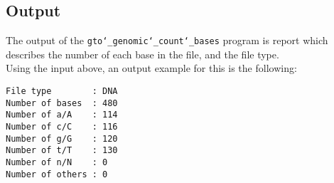 \subsection*{Output}
The output of the \texttt{gto\char`_genomic\char`_count\char`_bases} program is report which describes the number of each base in the file, and the file type.\\
Using the input above, an output example for this is the following:
\begin{lstlisting}
File type        : DNA
Number of bases  : 480
Number of a/A    : 114
Number of c/C    : 116
Number of g/G    : 120
Number of t/T    : 130
Number of n/N    : 0
Number of others : 0
\end{lstlisting}